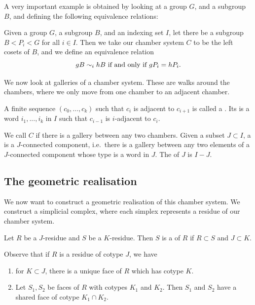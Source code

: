 \documentclass[11pt]{article}
\begin{document}
A very important example is obtained by looking at a group $G$, and a subgroup $B$, and defining the following equivalence relations: 

\begin{example}
    Given a group $G$, a subgroup $B$, and an indexing set $I$, let there be a subgroup $B<P_i<G$ for all $i\in I$. Then we take our chamber system $C$ to be the left cosets of $B$, and we define an equivalence relation
    \[gB\sim_{i}hB \textnormal{ if and only if }gP_i=hP_i.\]
\end{example}

We now look at galleries of a chamber system. These are walks around the chambers, where we only move from one chamber to an adjacent chamber. 

\begin{definition}
    A finite sequence $(c_0,...,c_k)$ such that $c_i$ is adjacent to $c_{i+1}$ is called a . Its  is a word $i_1,...,i_k$ in $I$ such that  $c_{i-1}$ is $i$-adjacent to $c_{i}$. 
\end{definition}

\begin{definition}
    We call $C$  if there is a gallery between any two chambers. Given a subset $J\subset I$, a  is a $J$-connected component, i.e.\ there is a gallery between any two elements of a $J$-connected component whose type is a word in $J$. The  of $J$ is $I-J$. 
\end{definition}


\subsection{The geometric realisation}


We now want to construct a geometric realisation of this chamber system. We construct a simplicial complex, where each simplex represents a residue of our chamber system.

\begin{definition}
    Let $R$ be a $J$-residue and $S$ be a $K$-residue. Then $S$ is a  of $R$ if $R\subset S$ and $J\subset K$. 
\end{definition}

Observe that if $R$ is a residue of cotype $J$, we have
\begin{enumerate}
    \item for $K\subset J$, there is a unique face of $R$ which has cotype $K$.
    \item Let $S_1,S_2$ be faces of $R$ with cotypes $K_1$ and $K_2$. Then $S_1$ and $S_2$ have a shared face of cotype $K_1\cap K_2$. 
\end{enumerate}
\end{document}
